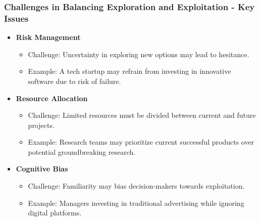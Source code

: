 \documentclass[aspectratio=169]{beamer}
\begin{document}
\begin{frame}[fragile]
    \frametitle{Challenges in Balancing Exploration and Exploitation - Key Issues}
    \begin{itemize}
        \item \textbf{Risk Management}
        \begin{itemize}
            \item Challenge: Uncertainty in exploring new options may lead to hesitance.
            \item Example: A tech startup may refrain from investing in innovative software due to risk of failure.
        \end{itemize}
        
        \item \textbf{Resource Allocation}
        \begin{itemize}
            \item Challenge: Limited resources must be divided between current and future projects.
            \item Example: Research teams may prioritize current successful products over potential groundbreaking research.
        \end{itemize}
        
        \item \textbf{Cognitive Bias}
        \begin{itemize}
            \item Challenge: Familiarity may bias decision-makers towards exploitation.
            \item Example: Managers investing in traditional advertising while ignoring digital platforms.
        \end{itemize}
    \end{itemize}
\end{frame}
\end{document}
